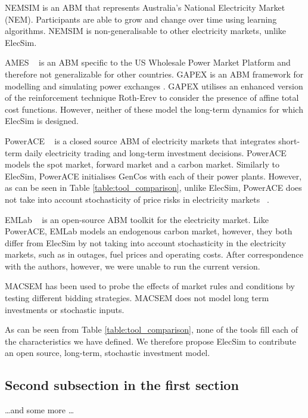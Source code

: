 NEMSIM \cite{Grozev2005} is an ABM that represents Australia's National Electricity Market (NEM). Participants are able to grow and change over time using learning algorithms. NEMSIM is non-generalisable to other electricity markets, unlike ElecSim.

AMES ~\cite{Sun2007} is an ABM specific to the US Wholesale Power Market Platform and therefore not generalizable for other countries. GAPEX \cite{Cincotti2013} is an ABM framework for modelling and simulating power exchanges . GAPEX utilises an enhanced version of the reinforcement technique Roth-Erev \cite{RothAE1995} to consider the presence of affine total cost functions. However, neither of these model the long-term dynamics for which ElecSim is designed.



PowerACE ~\cite{Rothengatter2007} is a closed source ABM of electricity markets that integrates short-term daily electricity trading and long-term investment decisions. PowerACE models the spot market, forward market and a carbon market. Similarly to ElecSim, PowerACE initialises GenCos with each of their power plants. However, as can be seen in Table \ref{table:tool_comparison}, unlike ElecSim, PowerACE does not take into account stochasticity of price risks in electricity markets ~\cite{Most2010}.

EMLab ~\cite{Chappin2017} is an open-source ABM toolkit for the electricity market. Like PowerACE, EMLab models an endogenous carbon market, however, they both differ from ElecSim by not taking into account stochasticity in the electricity markets, such as in outages, fuel prices and operating costs. After correspondence with the authors, however, we were unable to run the current version.

MACSEM \cite{Praca2003} has been used to probe the effects of market rules and conditions by testing different bidding strategies. MACSEM does not model long term investments or stochastic inputs.


As can be seen from Table \ref{table:tool_comparison}, none of the tools fill each of the characteristics we have defined. We therefore propose ElecSim to contribute an open source, long-term, stochastic investment model. 






\subsection{Second subsection in the first section}
\dots and some more \dots

